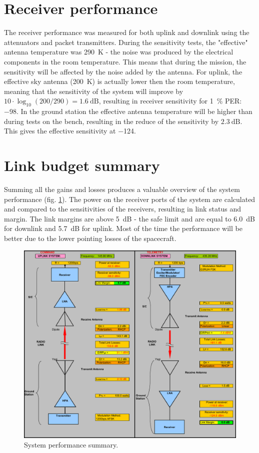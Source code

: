 \section{Receiver performance}
The receiver performance was measured for both uplink and downlink using the attenuators and packet transmitters. During the sensitivity tests, the "effective" antenna temperature was \SI{290}{\kelvin} - the noise was produced by the electrical components in the room temperature. This means that during the mission, the sensitivity will be affected by the noise added by the antenna.
For uplink, the effective sky antenna (\SI{200}{\kelvin}) is actually lower then the room temperature, meaning that the sensitivity of the system will improve by $10\cdot \log_{10}(200/290) = \SI{1.6}{\dB}$, resulting in receiver sensitivity for \SI{1}{\percent} PER: \SI{-98}{\dBm}.
In the ground station the effective antenna temperature will be higher than during tests on the bench, resulting in the reduce of the sensitivity by $\SI{2.3}{\dB}$. This gives the effective sensitivity at \SI{-124}{\dBm}.


\section{Link budget summary}
Summing all the gains and losses produces a valuable overview of the system performance (fig. \ref{link:link_status}). The power on the receiver ports of the system are calculated and compared to the sensitivities of the receivers, resulting in link status and margin. The link margins are above \SI{5}{\dB} - the safe limit and are equal to \SI{6.0}{\dB} for downlink and \SI{5.7}{\dB} for uplink. Most of the time the performance will be better due to the lower pointing losses of the spacecraft. 

\begin{figure}
    \centering
    \includegraphics[width=0.8\paperwidth]{img/8/link_summary.pdf}
    \caption{System performance summary.}
    \label{link:link_status}
\end{figure}